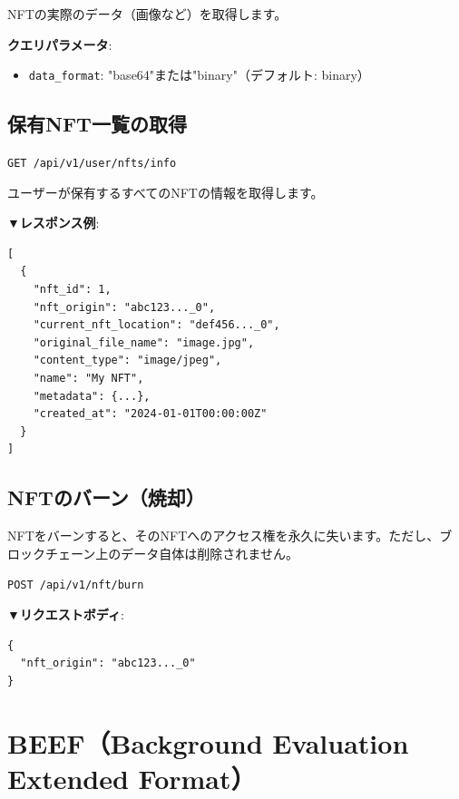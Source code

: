 \documentclass[11pt,a4paper]{ltjsarticle}  %
\begin{document}
NFTの実際のデータ（画像など）を取得します。

\textbf{クエリパラメータ}:
\begin{itemize}
    \item \texttt{data\_format}: "base64"または"binary"（デフォルト: binary）
\end{itemize}

\subsection{保有NFT一覧の取得}

\begin{tcolorbox}[colback=blue!5,colframe=blue!50!black,title=エンドポイント]
\texttt{GET /api/v1/user/nfts/info}
\end{tcolorbox}

ユーザーが保有するすべてのNFTの情報を取得します。

\textbf{▼レスポンス例}:
\begin{lstlisting}[style=json]
[
  {
    "nft_id": 1,
    "nft_origin": "abc123..._0",
    "current_nft_location": "def456..._0",
    "original_file_name": "image.jpg",
    "content_type": "image/jpeg",
    "name": "My NFT",
    "metadata": {...},
    "created_at": "2024-01-01T00:00:00Z"
  }
]
\end{lstlisting}

\subsection{NFTのバーン（焼却）}

\begin{tcolorbox}[colback=red!10,colframe=red!50!black,title=警告]
NFTをバーンすると、そのNFTへのアクセス権を永久に失います。ただし、ブロックチェーン上のデータ自体は削除されません。
\end{tcolorbox}

\begin{tcolorbox}[colback=blue!5,colframe=blue!50!black,title=エンドポイント]
\texttt{POST /api/v1/nft/burn}
\end{tcolorbox}

\textbf{▼リクエストボディ}:
\begin{lstlisting}[style=json]
{
  "nft_origin": "abc123..._0"
}
\end{lstlisting}

\section{BEEF（Background Evaluation Extended Format）}
\end{document}
